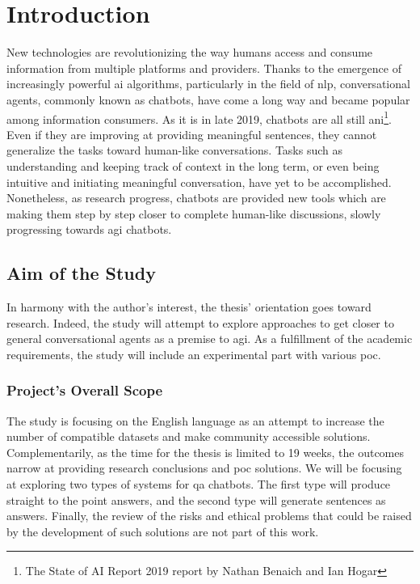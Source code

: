 \chapter{Introduction}
\label{chap:introduction}

New technologies are revolutionizing the way humans access and consume information from multiple platforms and providers. Thanks to the emergence of increasingly powerful \gls{ai} algorithms, particularly in the field of \gls{nlp}, conversational agents, commonly known as chatbots, have come a long way and became popular among information consumers. As it is in late 2019, chatbots are all still \gls{ani}\footnote{The State of AI Report 2019 report by Nathan Benaich and Ian Hogar\cite{studies:state_of_ai_2019}}. Even if they are improving at providing meaningful sentences, they cannot generalize the tasks toward human-like conversations. Tasks such as understanding and keeping track of context in the long term, or even being intuitive and initiating meaningful conversation, have yet to be accomplished. Nonetheless, as research progress, chatbots are provided new tools which are making them step by step closer to complete human-like discussions, slowly progressing towards \gls{agi} chatbots.


\section{Aim of the Study}
In harmony with the author's interest, the thesis' orientation goes toward research. Indeed, the study will attempt to explore approaches to get closer to general conversational agents as a premise to \gls{agi}. As a fulfillment of the academic requirements, the study will include an experimental part with various \gls{poc}.

\subsection{Project's Overall Scope}
The study is focusing on the English language as an attempt to increase the number of compatible datasets and make community accessible solutions. Complementarily, as the time for the thesis is limited to 19 weeks, the outcomes narrow at providing research conclusions and \gls{poc} solutions. We will be focusing at exploring two types of systems for \gls{qa} chatbots. The first type will produce straight to the point answers, and the second type will generate sentences as answers. Finally, the review of the risks and ethical problems that could be raised by the development of such solutions are not part of this work.
\newpage



